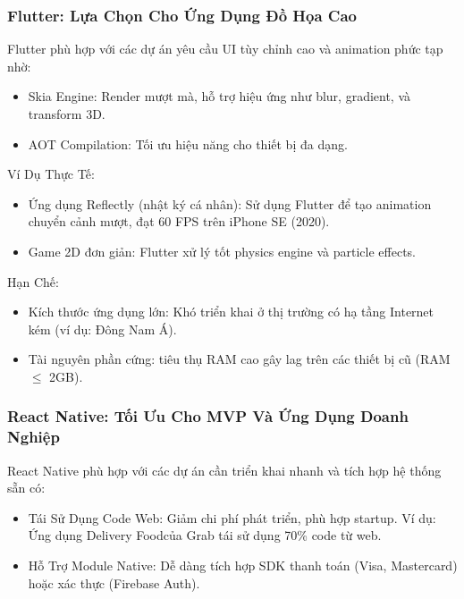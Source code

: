 \subsubsection{Flutter: Lựa Chọn Cho Ứng Dụng Đồ Họa Cao}
\begin{flushleft}
  \hspace*{0.8cm}Flutter phù hợp với các dự án yêu cầu UI tùy chỉnh cao và animation phức tạp nhờ:
  \setlength{\leftmargini}{1.5cm}
  \begin{itemize}
    \item Skia Engine: Render mượt mà, hỗ trợ hiệu ứng như blur, gradient, và transform 3D.
    \item AOT Compilation: Tối ưu hiệu năng cho thiết bị đa dạng.
  \end{itemize}
\end{flushleft}

\begin{flushleft}
  \hspace*{0.8cm}Ví Dụ Thực Tế:
  \setlength{\leftmargini}{1.5cm}
  \begin{itemize}
      \item Ứng dụng Reflectly (nhật ký cá nhân): Sử dụng Flutter để tạo animation chuyển cảnh mượt, đạt 60 FPS trên iPhone SE (2020).
      \item Game 2D đơn giản: Flutter xử lý tốt physics engine và particle effects.
  \end{itemize}
\end{flushleft}

\begin{flushleft}
  \hspace*{0.8cm}Hạn Chế:
  \setlength{\leftmargini}{1.5cm}
  \begin{itemize}
      \item Kích thước ứng dụng lớn: Khó triển khai ở thị trường có hạ tầng Internet kém (ví dụ: Đông Nam Á).
      \item Tài nguyên phần cứng: tiêu thụ RAM cao gây lag trên các thiết bị cũ (RAM $\leq$ 2GB).
  \end{itemize}
\end{flushleft}

\subsubsection{React Native: Tối Ưu Cho MVP Và Ứng Dụng Doanh Nghiệp}
    \begin{flushleft}
      \hspace*{0.8cm}React Native phù hợp với các dự án cần triển khai nhanh và tích hợp hệ thống sẵn có:
      \setlength{\leftmargini}{1.5cm}
      \begin{itemize}
        \item Tái Sử Dụng Code Web: Giảm chi phí phát triển, phù hợp startup. Ví dụ: Ứng dụng Delivery Foodcủa Grab tái sử dụng 70\% code từ web.
        \item Hỗ Trợ Module Native: Dễ dàng tích hợp SDK thanh toán (Visa, Mastercard) hoặc xác thực (Firebase Auth).
      \end{itemize}
    \end{flushleft}

